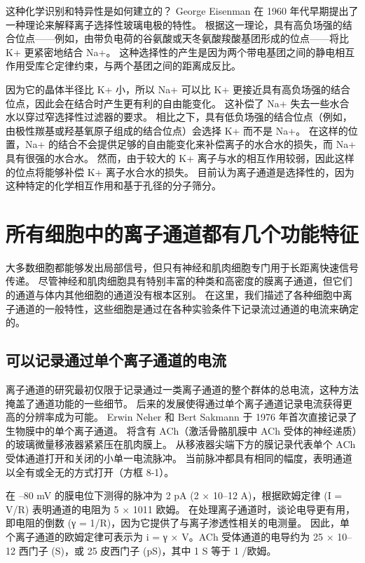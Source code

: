 这种化学识别和特异性是如何建立的？ 
George Eisenman 在 1960 年代早期提出了一种理论来解释离子选择性玻璃电极的特性。 
根据这一理论，具有高负场强的结合位点——例如，由带负电荷的谷氨酸或天冬氨酸羧酸基团形成的位点——将比 K+ 更紧密地结合 Na+。 
这种选择性的产生是因为两个带电基团之间的静电相互作用受库仑定律约束，与两个基团之间的距离成反比。


因为它的晶体半径比 K+ 小，所以 Na+ 可以比 K+ 更接近具有高负场强的结合位点，因此会在结合时产生更有利的自由能变化。 
这补偿了 Na+ 失去一些水合水以穿过窄选择性过滤器的要求。 
相比之下，具有低负场强的结合位点（例如，由极性羰基或羟基氧原子组成的结合位点）会选择 K+ 而不是 Na+。 
在这样的位置，Na+ 的结合不会提供足够的自由能变化来补偿离子的水合水的损失，而 Na+ 具有很强的水合水。 
然而，由于较大的 K+ 离子与水的相互作用较弱，因此这样的位点将能够补偿 K+ 离子水合水的损失。 
目前认为离子通道是选择性的，因为这种特定的化学相互作用和基于孔径的分子筛分。



\section{所有细胞中的离子通道都有几个功能特征}
大多数细胞都能够发出局部信号，但只有神经和肌肉细胞专门用于长距离快速信号传递。 
尽管神经和肌肉细胞具有特别丰富的种类和高密度的膜离子通道，但它们的通道与体内其他细胞的通道没有根本区别。 
在这里，我们描述了各种细胞中离子通道的一般特性，这些细胞是通过在各种实验条件下记录流过通道的电流来确定的。


\subsection{可以记录通过单个离子通道的电流}
离子通道的研究最初仅限于记录通过一类离子通道的整个群体的总电流，这种方法掩盖了通道功能的一些细节。 
后来的发展使得通过单个离子通道记录电流获得更高的分辨率成为可能。 
Erwin Neher 和 Bert Sakmann 于 1976 年首次直接记录了生物膜中的单个离子通道。
将含有 ACh（激活骨骼肌膜中 ACh 受体的神经递质）的玻璃微量移液器紧紧压在肌肉膜上。 
从移液器尖端下方的膜记录代表单个 ACh 受体通道打开和关闭的小单一电流脉冲。 
当前脉冲都具有相同的幅度，表明通道以全有或全无的方式打开（方框 8-1）。


在 –80 mV 的膜电位下测得的脉冲为 2 pA (2 × 10–12 A)，根据欧姆定律 (I = V/R) 表明通道的电阻为 5 × 1011 欧姆。 
在处理离子通道时，谈论电导更有用，即电阻的倒数 (γ = 1/R)，因为它提供了与离子渗透性相关的电测量。
因此，单个离子通道的欧姆定律可表示为 i = γ × V。ACh 受体通道的电导约为 25 × 10–12 西门子 (S)，或 25 皮西门子 (pS)，其中 1 S 等于 1 /欧姆。


